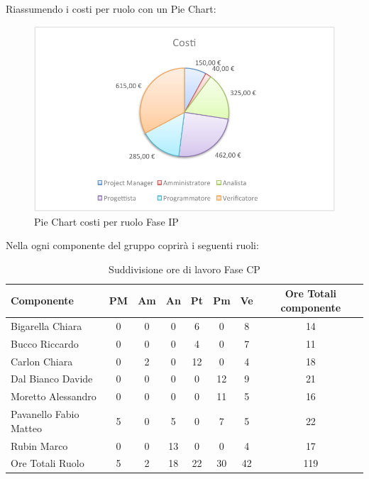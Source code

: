 				Riassumendo i costi per ruolo con un Pie Chart:
				\begin{figure}[H]\centering
					\includegraphics[width=\textwidth]{PianoDiProgetto/Pics/ChartTotCostiFaseIP.pdf}
					\caption{Pie Chart costi per ruolo Fase IP}
				\end{figure}
				Nella  ogni componente del gruppo \groupname{} coprirà i seguenti ruoli:
				\begin{table}[H]
					\begin{center}
						\begin{tabular}{| l | c | c | c | c | c | c | c |}
							\hline
							Componente 					& PM	& Am 	& An 	& Pt 		& Pm 	& Ve 		& Ore Totali componente \\ \hline
							
							Bigarella Chiara 			& 0		& 0		& 0		& 6 		& 0		& 8 		& 14 \\
							Bucco Riccardo 				& 0		& 0		& 0		& 4 		& 0		& 7 		& 11 \\
							Carlon Chiara	 			& 0		& 2 	& 0		& 12 		& 0		& 4 		& 18 \\
							Dal Bianco Davide 			& 0		& 0		& 0		& 0			& 12 	& 9 		& 21 \\
							Moretto Alessandro 			& 0		& 0		& 0		& 0			& 11 	& 5			& 16 \\
							Pavanello Fabio Matteo	 	& 5 	& 0		& 5		& 0			& 7 	& 5 		& 22 \\
							Rubin Marco					& 0		& 0		& 13 	& 0			& 0		& 4 		& 17 \\ \hline \hline
							
							Ore Totali Ruolo 			& 5 	& 2 	& 18 	& 22 		& 30 	& 42 		& 119\\ \hline
						\end{tabular}
					\end{center}
					\caption{Suddivisione ore di lavoro Fase CP}
				\end{table}

